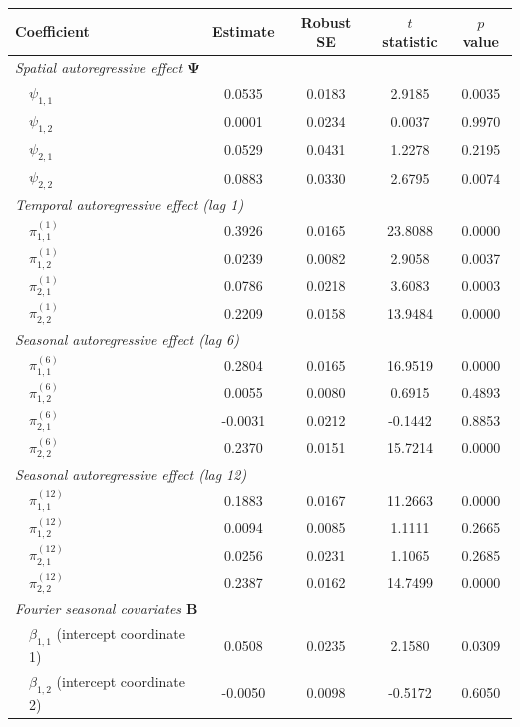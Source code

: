 \documentclass[12pt]{article}
\theoremstyle{plain}
\theoremstyle{definition}
\newcommand{\xmat}{\mathbf}
\begin{document}
\begin{table}[t]
\centering
\scriptsize{
\begin{tabular}{cl cccc}
\hline
\multicolumn{2}{l}{Coefficient} & Estimate & Robust SE & $t$ statistic & $p$ value \\
\hline
\multicolumn{6}{l}{\emph{Spatial autoregressive effect $\xmat{\Psi}$}} \\
& $\psi_{1,1}$ & 0.0535 & 0.0183 & 2.9185 & 0.0035 \\
& $\psi_{1,2}$ & 0.0001 & 0.0234 & 0.0037 & 0.9970 \\
& $\psi_{2,1}$ & 0.0529 & 0.0431 & 1.2278 & 0.2195 \\
& $\psi_{2,2}$ & 0.0883 & 0.0330 & 2.6795 & 0.0074 \\
\hline
\multicolumn{6}{l}{\emph{Temporal autoregressive effect (lag 1)}} \\
& $\pi^{(1)}_{1,1}$ & 0.3926 & 0.0165 & 23.8088 & 0.0000 \\
& $\pi^{(1)}_{1,2}$ & 0.0239 & 0.0082 & 2.9058 & 0.0037 \\
& $\pi^{(1)}_{2,1}$ & 0.0786 & 0.0218 & 3.6083 & 0.0003 \\
& $\pi^{(1)}_{2,2}$ & 0.2209 & 0.0158 & 13.9484 & 0.0000 \\
\hline
\multicolumn{6}{l}{\emph{Seasonal autoregressive effect (lag 6)}} \\
& $\pi^{(6)}_{1,1}$ & 0.2804 & 0.0165 & 16.9519 & 0.0000 \\
& $\pi^{(6)}_{1,2}$ & 0.0055 & 0.0080 & 0.6915 & 0.4893 \\
& $\pi^{(6)}_{2,1}$ & -0.0031 & 0.0212 & -0.1442 & 0.8853 \\
& $\pi^{(6)}_{2,2}$ & 0.2370 & 0.0151 & 15.7214 & 0.0000 \\
\hline
\multicolumn{6}{l}{\emph{Seasonal autoregressive effect (lag 12)}} \\
& $\pi^{(12)}_{1,1}$ & 0.1883 & 0.0167 & 11.2663 & 0.0000 \\
& $\pi^{(12)}_{1,2}$ & 0.0094 & 0.0085 & 1.1111 & 0.2665 \\
& $\pi^{(12)}_{2,1}$ & 0.0256 & 0.0231 & 1.1065 & 0.2685 \\
& $\pi^{(12)}_{2,2}$ & 0.2387 & 0.0162 & 14.7499 & 0.0000 \\
\hline
\multicolumn{6}{l}{\emph{Fourier seasonal covariates $\xmat{B}$}} \\
& $\beta_{1,1}$ (intercept coordinate 1) & 0.0508 & 0.0235 & 2.1580 & 0.0309 \\
& $\beta_{1,2}$ (intercept coordinate 2) & -0.0050 & 0.0098 & -0.5172 & 0.6050 \\

\end{tabular}}
\end{table}
\end{document}
